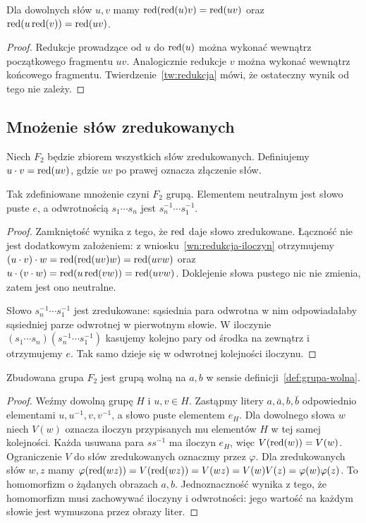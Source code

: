 \begin{wniosek}\label{wn:redukcja-iloczyn}
Dla dowolnych słów $u,v$ mamy $\operatorname{red}(\operatorname{red}(u)v)=\operatorname{red}(uv)$ oraz $\operatorname{red}(u\operatorname{red}(v))=\operatorname{red}(uv)$.
\end{wniosek}
\begin{proof}
Redukcje prowadzące od $u$ do $\operatorname{red}(u)$ można wykonać wewnątrz początkowego fragmentu $uv$. Analogicznie redukcje $v$ można wykonać wewnątrz końcowego fragmentu. Twierdzenie~\ref{tw:redukcja} mówi, że ostateczny wynik od tego nie zależy.
\end{proof}

\subsection{Mnożenie słów zredukowanych}
Niech $F_2$ będzie zbiorem wszystkich słów zredukowanych. Definiujemy $u\cdot v=\operatorname{red}(uv)$, gdzie $uv$ po prawej oznacza złączenie słów.
\begin{stwierdzenie}\label{st:grupa-slow}
Tak zdefiniowane mnożenie czyni $F_2$ grupą. Elementem neutralnym jest słowo puste $e$, a odwrotnością $s_1\cdots s_n$ jest $s_n^{-1}\cdots s_1^{-1}$.
\end{stwierdzenie}
\begin{proof}
Zamkniętość wynika z tego, że $\operatorname{red}$ daje słowo zredukowane. Łączność nie jest dodatkowym założeniem: z wniosku~\ref{wn:redukcja-iloczyn} otrzymujemy $(u\cdot v)\cdot w=\operatorname{red}(\operatorname{red}(uv)w)=\operatorname{red}(uvw)$ oraz $u\cdot(v\cdot w)=\operatorname{red}(u\operatorname{red}(vw))=\operatorname{red}(uvw)$. Doklejenie słowa pustego nic nie zmienia, zatem jest ono neutralne.

Słowo $s_n^{-1}\cdots s_1^{-1}$ jest zredukowane: sąsiednia para odwrotna w nim odpowiadałaby sąsiedniej parze odwrotnej w pierwotnym słowie. W iloczynie $(s_1\cdots s_n)(s_n^{-1}\cdots s_1^{-1})$ kasujemy kolejno pary od środka na zewnątrz i otrzymujemy $e$. Tak samo dzieje się w odwrotnej kolejności iloczynu.
\end{proof}
\begin{twierdzenie}\label{tw:uniwersalnosc}
Zbudowana grupa $F_2$ jest grupą wolną na $a,b$ w sensie definicji~\ref{def:grupa-wolna}.
\end{twierdzenie}
\begin{proof}
Weźmy dowolną grupę $H$ i $u,v\in H$. Zastąpmy litery $a,\bar a,b,\bar b$ odpowiednio elementami $u,u^{-1},v,v^{-1}$, a słowo puste elementem $e_H$. Dla dowolnego słowa $w$ niech $V(w)$ oznacza iloczyn przypisanych mu elementów $H$ w tej samej kolejności. Każda usuwana para $ss^{-1}$ ma iloczyn $e_H$, więc $V(\operatorname{red}(w))=V(w)$. Ograniczenie $V$ do słów zredukowanych oznaczmy przez $\varphi$. Dla zredukowanych słów $w,z$ mamy $\varphi(\operatorname{red}(wz))=V(\operatorname{red}(wz))=V(wz)=V(w)V(z)=\varphi(w)\varphi(z)$. To homomorfizm o żądanych obrazach $a,b$. Jednoznaczność wynika z tego, że homomorfizm musi zachowywać iloczyny i odwrotności: jego wartość na każdym słowie jest wymuszona przez obrazy liter.
\end{proof}
